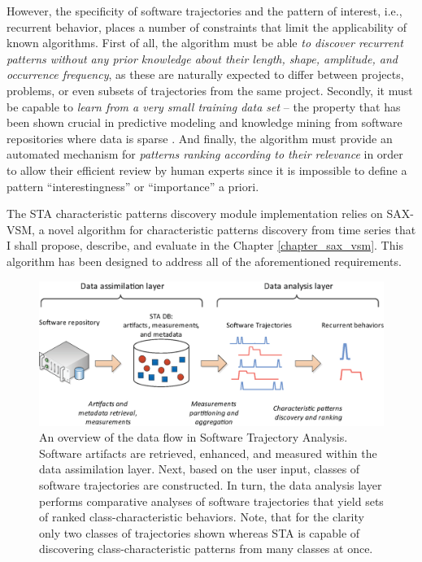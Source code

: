 However, the specificity of software trajectories and the pattern of interest, i.e., recurrent behavior, 
places a number of constraints that limit the applicability of known algorithms.
First of all, the algorithm must be able \textit{to discover recurrent patterns without any prior knowledge 
about their length, shape, amplitude, and occurrence frequency}, as these are naturally expected to differ 
between projects, problems, or even subsets of trajectories from the same project.
Secondly, it must be capable to \textit{learn from a very small training data set} --
the property that has been shown crucial in predictive modeling and knowledge mining from software 
repositories where data is sparse \cite{citeulike:6055293}.
And finally, the algorithm must provide an automated mechanism for 
\textit{patterns ranking according to their relevance} in order to allow their efficient 
review by human experts since it is impossible to define a pattern ``interestingness'' or 
``importance'' a priori.

The STA characteristic patterns discovery module implementation relies on SAX-VSM,
a novel algorithm for characteristic patterns discovery from time series that I shall propose, describe, and evaluate 
in the Chapter \ref{chapter_sax_vsm}. 
This algorithm has been designed to address all of the aforementioned requirements.

\begin{figure}[t]
   \centering
   \includegraphics[width=150mm]{figures/Flow-analysis.eps}
   \caption[An overview of the data flow in Software Trajectory Analysis.]{An overview of the data flow in Software Trajectory Analysis.
   Software artifacts are retrieved, enhanced, and measured within the
   data assimilation layer. Next, based on the user input, classes of software trajectories are constructed.   
   In turn, the data analysis layer performs comparative analyses of software trajectories that yield sets
   of ranked class-characteristic behaviors.
   Note, that for the clarity only two classes of trajectories shown whereas STA is capable of discovering
   class-characteristic patterns from many classes at once.}
   \label{fig:sta-full-overview}
\end{figure}

